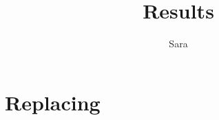 \documentclass[11pt]{article}
\title{\textbf{Results}}
\author{Sara}
\date{}
\begin{document}
\maketitle
\section {Replacing}
\begin{comment}
\begin{table*}
\begin{tabular}{c|ccccc|}
	          & Accepted & Rejected & Accepted    & Rejected  &  \\
	Benchmark & Correct & Correct &  Error        &  Error & Reexecuted \\
	\hline
	Scale & 97.875\% & 0.915\% &  0.091\% &1.118\% & 2.034\%\\
	BlackScholes & 98.611\% &0.997\%   &0.134\%  &  1.254\%& 1.254 \% \\
	Water & 96.578\% & 0.788\% & 1.166\% & 1.467 \% & 2.25\%\\
	Barnes & 96.704\% & 3.028\% & 0.134\% & 0.134\% & 3.162\%\\
\end{tabular}
\caption {Overall Outlier Detector Effectiveness}
\label{tbl:outlierquality}
\end{table*}
\end{comment}
\end{document}
